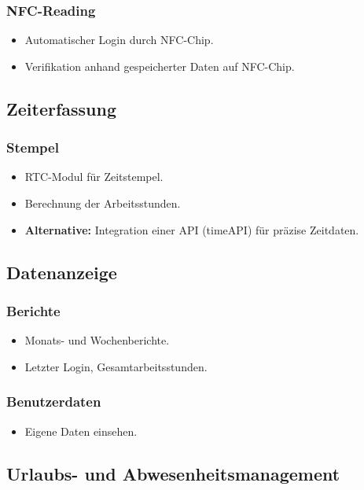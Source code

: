 \documentclass{article}
\begin{document}
\subsubsection*{NFC-Reading}
\begin{itemize}
  \item Automatischer Login durch NFC-Chip.
  \item Verifikation anhand gespeicherter Daten auf NFC-Chip.
\end{itemize}

\subsection*{Zeiterfassung}

\subsubsection*{Stempel}
\begin{itemize}
  \item RTC-Modul für Zeitstempel.
  \item Berechnung der Arbeitsstunden.
  \item \textbf{Alternative:} Integration einer API (timeAPI) für präzise Zeitdaten.
\end{itemize}

\subsection*{Datenanzeige}

\subsubsection*{Berichte}
\begin{itemize}
  \item Monats- und Wochenberichte.
  \item Letzter Login, Gesamtarbeitsstunden.
\end{itemize}

\subsubsection*{Benutzerdaten}
\begin{itemize}
  \item Eigene Daten einsehen.
\end{itemize}

\subsection*{Urlaubs- und Abwesenheitsmanagement}
\end{document}
